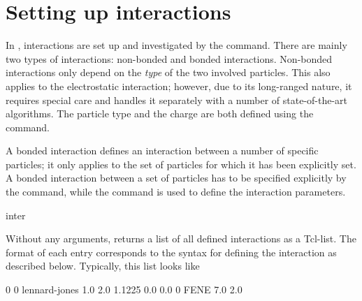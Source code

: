 %  
%   
%  
%  
%
\chapter{Setting up interactions}
\label{sec:inter}

In \es, interactions are set up and investigated by the
 command. There are mainly two types of interactions:
non-bonded and bonded interactions. Non-bonded interactions only
depend on the \emph{type} of the two involved particles. This also
applies to the electrostatic interaction; however, due to its
long-ranged nature, it requires special care and \es handles it
separately with a number of state-of-the-art algorithms. The particle
type and the charge are both defined using the  command.

A bonded interaction defines an interaction between a number of
specific particles; it only applies to the set of particles for which
it has been explicitly set.  A bonded interaction between a set of
particles has to be specified explicitly by the 
command, while the  command is used to define the
interaction parameters.

\begin{essyntax}
  inter
\end{essyntax}
Without any arguments,  returns a list of all defined
interactions as a Tcl-list. The format of each entry corresponds to
the syntax for defining the interaction as described below. Typically,
this list looks like
\begin{tclcode}
  {0 0 lennard-jones 1.0 2.0 1.1225 0.0 0.0} {0 FENE 7.0 2.0}
\end{tclcode}


